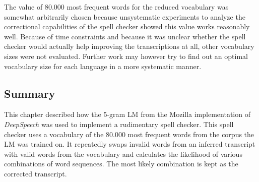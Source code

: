 The value of $80.000$ most frequent words for the reduced vocabulary was somewhat arbitrarily chosen because unsystematic experiments to analyze the correctional capabilities of the spell checker showed this value works reasonably well. Because of time constraints and because it was unclear whether the spell checker would actually help improving the transcriptions at all, other vocabulary sizes were not evaluated. Further work may however try to find out an optimal vocabulary size for each language in a more systematic manner.

\subsection{Summary}

This chapter described how the $5$-gram \ac{LM} from the Mozilla implementation of \textit{DeepSpeech} was used to implement a rudimentary spell checker. This spell checker uses a vocabulary of the $80.000$ most frequent words from the corpus the \ac{LM} was trained on. It repeatedly swaps invalid words from an inferred transcript with valid words from the vocabulary and calculates the likelihood of various combinations of word sequences. The most likely combination is kept as the corrected transcript.